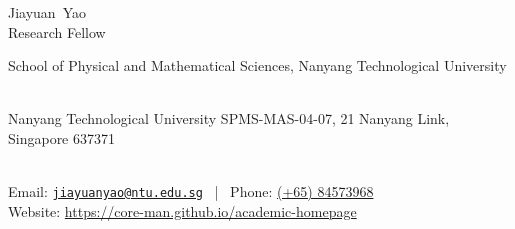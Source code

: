 \documentclass[11pt, a4paper]{article}
\makeatletter
\newcommand{\FirstName}{Jiayuan}
\newcommand{\LastName}{Yao}
\newcommand{\MyName}{\FirstName\ \LastName}
\newcommand{\MyRole}{Research Fellow}
\newcommand{\Email}{jiayuanyao@ntu.edu.sg}
\newcommand{\Website}{https://core-man.github.io/academic-homepage}
\newcommand{\Phone}{(+65) 84573968}
\newcommand{\Affiliation}{
    School of Physical and Mathematical Sciences,
    Nanyang Technological University
}
\newcommand{\Address}{
    Nanyang Technological University SPMS-MAS-04-07, 21 Nanyang Link, Singapore 637371
}
\newcommand{\makefield}[2]{\makebox[1.5em]{\color{MarkerColour!80!black}#1} #2}
\makeatother
\begin{document}
\thispagestyle{empty}

\begin{center}
    {\fontsize{36pt}{0}\selectfont \MyName}
    \\[0.5cm]
    {\fontsize{16pt}{0}\selectfont \MyRole}
    \\[0.3cm]
    {\fontsize{10pt}{0}\selectfont
        \Affiliation
        \\[0.2cm]
        \Address
        \\[0.08cm]
        Email: \href{mailto:\Email}{\texttt{\Email}}
        \, | \,
        Phone: \url{\Phone}
        \\[0.08cm]
        Website: \url{\Website}
    }
\end{center}
















%
\end{document}
